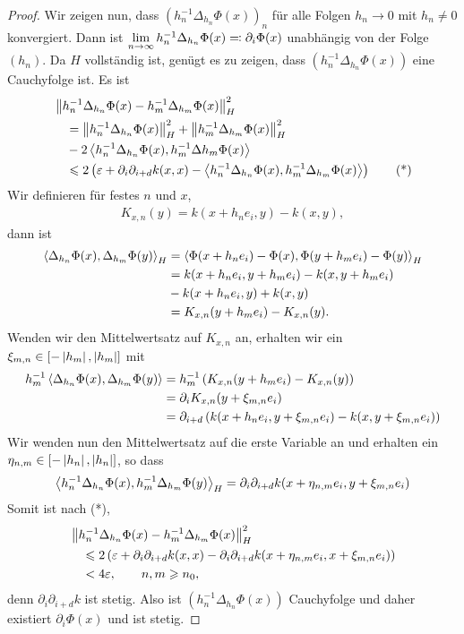 \begin{proof}
Wir zeigen nun, dass $(h_n^{-1}\Delta_{h_n}\Phi(x))_n$ für alle Folgen $h_n\to 0$
mit $h_n\neq 0$ konvergiert. Dann ist $\lim\limits_{n\to\infty} h_n^{-1}
\Delta_{h_n} \Phi(x) \eqcolon \partial_i \Phi(x)$ unabhängig von der Folge $(h_n)$. Da
$H$ vollständig ist, genügt es zu zeigen, dass $(h_n^{-1}\Delta_{h_n}\Phi(x))$
eine Cauchyfolge ist. Es ist
\begin{align*}
&\left\|h_n^{-1}\Delta_{h_n}\Phi(x)-h_m^{-1}\Delta_{h_m} \Phi(x)\right\|^2_H\\
&\quad= \left\|h_n^{-1}\Delta_{h_n}\Phi(x)\right\|_H^2
+ \left\|h_m^{-1}\Delta_{h_m}\Phi(x)\right\|_H^2\\
&\quad- 2 \left\langle h_n^{-1}\Delta_{h_n} \Phi(x),h_m^{-1}\Delta h_m \Phi(x)\right\rangle\\
&\quad\leqslant
2\left(\varepsilon + \partial_i\partial_{i+d}k(x,x)
-\left\langle h_n^{-1}\Delta_{h_n} \Phi(x),h_m^{-1}\Delta_{h_m} \Phi(x)\right\rangle\right)\tag{*}
\end{align*}
Wir definieren für festes $n$ und $x$,
\begin{align*}
K_{x,n}(y) = k(x+h_ne_i,y) - k(x,y),
\end{align*}
dann ist
\begin{align*}
\left\langle\Delta_{h_n} \Phi(x),\Delta_{h_m} \Phi(y)\right\rangle_H
&=
\left\langle\Phi(x+h_ne_i)-\Phi(x),\Phi(y+h_me_i)-\Phi(y)\right\rangle_H\\
&= k(x+h_ne_i,y+h_me_i) - k(x,y+h_me_i) \\ &
- k(x+h_ne_i,y) + k(x,y)\\ 
&= K_{x,n}(y+h_m e_i)-K_{x,n}(y).
\end{align*}
Wenden wir den Mittelwertsatz auf $K_{x,n}$ an, erhalten wir ein $\xi_{m,n}\in
[-\left|h_m\right|,\left|h_m\right|]$ mit
\begin{align*}
h_m^{-1}\left\langle\Delta_{h_n}\Phi(x),\Delta_{h_m} \Phi(y)\right\rangle
&= h_m^{-1}\left(K_{x,n}(y+h_m e_i)-K_{x,n}(y) \right)\\
&= \partial_i K_{x,n}(y+\xi_{m,n}e_i) \\
&= \partial_{i+d}\left(k(x+h_n
e_i,y+\xi_{m,n}e_i) - k(x,y+\xi_{m,n}e_i)\right)
\end{align*} 
Wir wenden nun den Mittelwertsatz auf die erste Variable an und erhalten ein
$\eta_{n,m}\in [-\left|h_n\right|,\left|h_n\right|]$, so dass
\begin{align*}
\left\langle h_n^{-1}\Delta_{h_n}\Phi(x),h_m^{-1}\Delta_{h_m} \Phi(y)\right\rangle_H
= \partial_i \partial_{i+d} k(x+\eta_{n,m}e_i,y+\xi_{m,n}e_i)
\end{align*}
Somit ist nach (*),
\begin{align*}
&\left\|h_n^{-1}\Delta_{h_n}\Phi(x)-h_m^{-1}\Delta_{h_m} \Phi(x)\right\|^2_H\\
&\quad\leqslant
2\left(\varepsilon + \partial_i\partial_{i+d}k(x,x)
-\partial_i \partial_{i+d} k(x+\eta_{n,m}e_i,x+\xi_{m,n}e_i)\right)\\
&\quad < 4\varepsilon,\qquad n,m\geqslant n_0,
\end{align*}
denn $\partial_i \partial_{i+d}k$ ist stetig. Also ist
$(h_n^{-1}\Delta_{h_n}\Phi(x))$ Cauchyfolge und daher existiert $\partial_i
\Phi(x)$ und ist stetig.


\end{proof}
